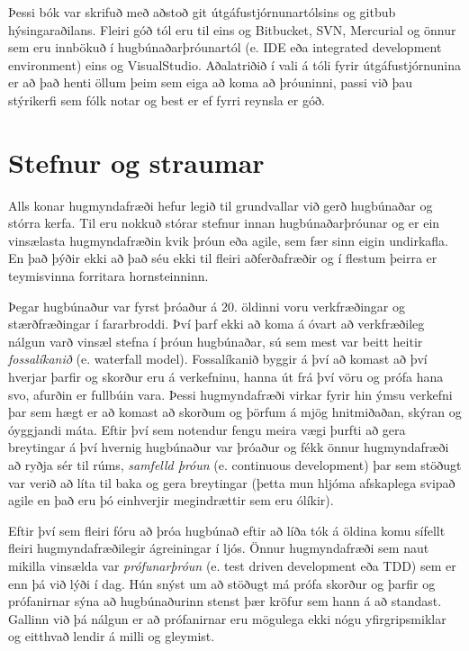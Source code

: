 Þessi bók var skrifuð með aðstoð git útgáfustjórnunartólsins og gitbub hýsingaraðilans.
Fleiri góð tól eru til eins og Bitbucket, SVN, Mercurial og önnur sem eru innbökuð í hugbúnaðarþróunartól (e. IDE eða integrated development environment) eins og VisualStudio.
Aðalatriðið í vali á tóli fyrir útgáfustjórnunina er að það henti öllum þeim sem eiga að koma að þróuninni, passi við þau stýrikerfi sem fólk notar og best er ef fyrri reynsla er góð.

\section{Stefnur og straumar}
Alls konar hugmyndafræði hefur legið til grundvallar við gerð hugbúnaðar og stórra kerfa.
Til eru nokkuð stórar stefnur innan hugbúnaðarþróunar og er ein vinsælasta hugmyndafræðin kvik þróun eða agile, sem fær sinn eigin undirkafla.
En það þýðir ekki að það séu ekki til fleiri aðferðafræðir og í flestum þeirra er teymisvinna forritara hornsteinninn.

Þegar hugbúnaður var fyrst þróaður á 20. öldinni voru verkfræðingar og stærðfræðingar í fararbroddi.
Því þarf ekki að koma á óvart að verkfræðileg nálgun varð vinsæl stefna í þróun hugbúnaðar, sú sem mest var beitt heitir \textit{fossalíkanið} (e. waterfall model).
Fossalíkanið byggir á því að komast að því hverjar þarfir og skorður eru á verkefninu, hanna út frá því vöru og prófa hana svo, afurðin er fullbúin vara.
Þessi hugmyndafræði virkar fyrir hin ýmsu verkefni þar sem hægt er að komast að skorðum og þörfum á mjög hnitmiðaðan, skýran og óyggjandi máta.
Eftir því sem notendur fengu meira vægi þurfti að gera breytingar á því hvernig hugbúnaður var þróaður og fékk önnur hugmyndafræði að ryðja sér til rúms, \textit{samfelld þróun} (e. continuous development) þar sem stöðugt var verið að líta til baka og gera breytingar (þetta mun hljóma afskaplega svipað agile en það eru þó einhverjir megindrættir sem eru ólíkir). 

Eftir því sem fleiri fóru að þróa hugbúnað eftir að líða tók á öldina komu sífellt fleiri hugmyndafræðilegir ágreiningar í ljós.
Önnur hugmyndafræði sem naut mikilla vinsælda var \textit{prófunarþróun} (e. test driven development eða TDD) sem er enn þá við lýði í dag.
Hún snýst um að stöðugt má prófa skorður og þarfir og prófanirnar sýna að hugbúnaðurinn stenst þær kröfur sem hann á að standast.
Gallinn við þá nálgun er að prófanirnar eru mögulega ekki nógu yfirgripsmiklar og eitthvað lendir á milli og gleymist.

